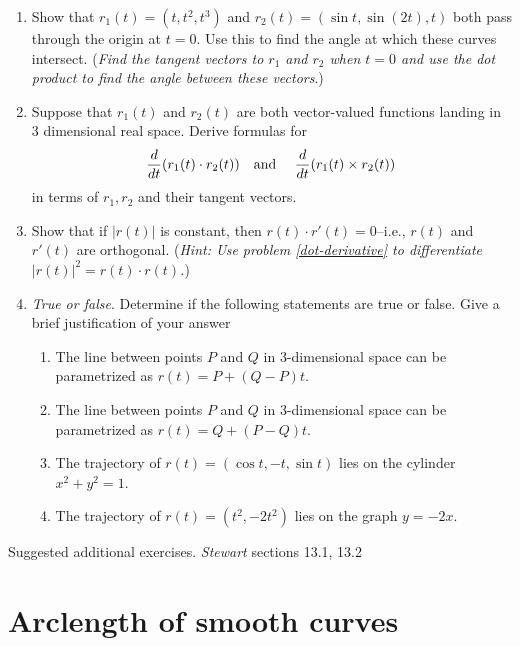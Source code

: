 \documentclass[12pt]{article}
\numberwithin{equation}{subsection}
\numberwithin{figure}{subsection}
\theoremstyle{note}
\begin{document}
{\begin{enumerate}[label=\arabic*.]
\item Show that $r_1(t)=(t, t^2, t^3)$ and $r_2(t)=(\sin t, \sin(2t), t)$ both pass through the origin at $t=0$. Use this to find the angle at which these curves intersect. (\textit{Find the tangent vectors to $r_1$ and $r_2$ when $t=0$ and use the dot product to find the angle between these vectors}.)


\item \label{dot-derivative} Suppose that $r_1(t)$ and $r_2(t)$ are both vector-valued functions landing in 3 dimensional real space. Derive formulas for \[ \dfrac{d}{dt} (r_1(t)\cdot r_2(t)) \text{\quad and \quad }\dfrac{d}{dt} (r_1(t) \times r_2(t))\] in terms of $r_1, r_2$ and their tangent vectors. 

\item Show that if $|r(t)|$ is constant, then $r(t)\cdot r'(t)=0$--i.e., $r(t)$ and $r'(t)$ are orthogonal. (\textit{Hint: Use problem \ref{dot-derivative} to differentiate $|r(t)|^2=r(t)\cdot r(t)$.}) \label{tan-to-derivative}

\item \textit{True or false}. Determine if the following statements are true or false. Give a brief justification of your answer

\begin{enumerate}
	\item The line between points $P$ and $Q$ in 3-dimensional space can be parametrized as $r(t)=P+(Q-P)t$.
	\item The line between points $P$ and $Q$ in 3-dimensional space can be parametrized as $r(t)=Q+(P-Q)t$.
	\item The trajectory of $r(t)=( \cos t, -t, \sin t)$ lies on the cylinder $x^2+y^2=1$. 
	\item The trajectory of $r(t)=(t^2,-2t^2)$ lies on the graph $y=-2x$.
\end{enumerate}
\end{enumerate}

Suggested additional exercises. \textit{Stewart} sections 13.1, 13.2



\section{Arclength of smooth curves}


}
\end{document}
